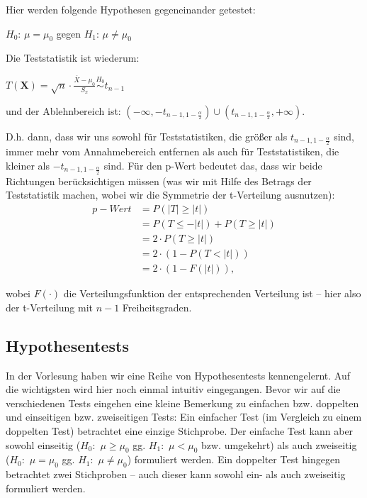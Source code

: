 \documentclass[a4paper]{article}
\newcommand{\simtext}[1]{\ensuremath{\stackrel{\text{#1}}{\sim}}}
\begin{document}
Hier werden folgende Hypothesen gegeneinander getestet:
\begin{center} $H_0$: $\mu = \mu_0$ \hspace{2cm }gegen \hspace{2cm } $H_1$: $\mu \neq \mu_0$ \end{center}
Die Teststatistik ist wiederum:
\begin{center} $T(\textbf{X})=\sqrt{n}\cdot\frac{\overline{X}-\mu_0}{S_x} \simtext{$H_0$} t_{n-1}$ \end{center}
und der Ablehnbereich ist: $(-\infty, -t_{n-1,1-\frac{\alpha}{2}}) \cup (t_{n-1,1-\frac{\alpha}{2}}, +\infty)$.

\noindent D.h. dann, dass wir uns sowohl für Teststatistiken, die größer als $t_{n-1,1-\frac{\alpha}{2}}$ sind, immer mehr vom Annahmebereich entfernen als auch für Teststatistiken, die kleiner als $-t_{n-1,1-\frac{\alpha}{2}}$ sind. Für den p-Wert bedeutet das, dass wir beide Richtungen berücksichtigen müssen (was wir mit Hilfe des Betrags der Teststatistik machen, wobei wir die Symmetrie der t-Verteilung ausnutzen):
\begin{align*} 
p-Wert &= P(|T| \geq |t|)  \\
	&=	P(T \leq -|t|) + P(T \geq |t|)			\\
	&=	2 \cdot P(T \geq |t|)			\\
	&=	2 \cdot (1-P(T < |t|))			\\
	&=	2 \cdot (1-F(|t|)),		
\end{align*} 

\noindent wobei $F(\cdot)$ die Verteilungsfunktion der entsprechenden Verteilung ist -- hier also der t-Verteilung mit $n-1$ Freiheitsgraden.
\subsection{Hypothesentests}\label{sec:HypTests}

In der Vorlesung haben wir eine Reihe von Hypothesentests kennengelernt. Auf die wichtigsten wird hier noch einmal intuitiv eingegangen. Bevor wir auf die verschiedenen Tests eingehen eine kleine Bemerkung zu einfachen bzw. doppelten und einseitigen bzw. zweiseitigen Tests:
Ein einfacher Test (im Vergleich zu einem doppelten Test) betrachtet eine einzige Stichprobe. Der einfache Test kann aber sowohl einseitig ($H_0:$ $\mu \geq \mu_0$ gg. $H_1:$ $\mu < \mu_0$ bzw. umgekehrt) als auch zweiseitig ($H_0:$ $\mu = \mu_0$ gg. $H_1:$ $\mu \neq \mu_0$) formuliert werden. Ein doppelter Test hingegen betrachtet zwei Stichproben -- auch dieser kann sowohl ein- als auch zweiseitig formuliert werden.
\end{document}
